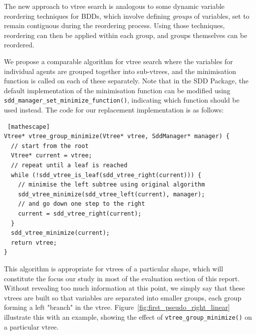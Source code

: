 \documentclass[11pt]{article}
\begin{document}
The new approach to vtree search is analogous to some dynamic variable reordering techniques for BDDs, which involve defining \textit{groups} of variables, set to remain contiguous during the reordering process. Using those techniques, reordering can then be applied within each group, and groups themselves can be reordered. 

We propose a comparable algorithm for vtree search where the variables for individual agents are grouped together into sub-vtrees, and the minimisation function is called on each of these separately. Note that in the SDD Package, the default implementation of the minimisation function can be modified using \texttt{sdd\_manager\_set\_minimize\_function()},  indicating which function should be used instead.
The code for our replacement implementation is as follows: 

\begin{lstlisting} [mathescape]
Vtree* vtree_group_minimize(Vtree* vtree, SddManager* manager) {
  // start from the root   
  Vtree* current = vtree; 
  // repeat until a leaf is reached
  while (!sdd_vtree_is_leaf(sdd_vtree_right(current))) {
    // minimise the left subtree using original algorithm
    sdd_vtree_minimize(sdd_vtree_left(current), manager);
    // and go down one step to the right
    current = sdd_vtree_right(current);	
  }
  sdd_vtree_minimize(current);
  return vtree;
} 
\end{lstlisting}

This algorithm is appropriate for vtrees of a particular shape, which will constitute the focus our study in most of the evaluation section of this report. Without revealing too much information at this point, we simply say
that these vtrees are built so that variables are separated into smaller groups, each group forming a left "branch" in the vtree. 
Figure~\ref{fig:first_pseudo_right_linear} illustrate this with an example, showing the effect of \texttt{vtree\_group\_minimize()} on a particular vtree.
\end{document}
